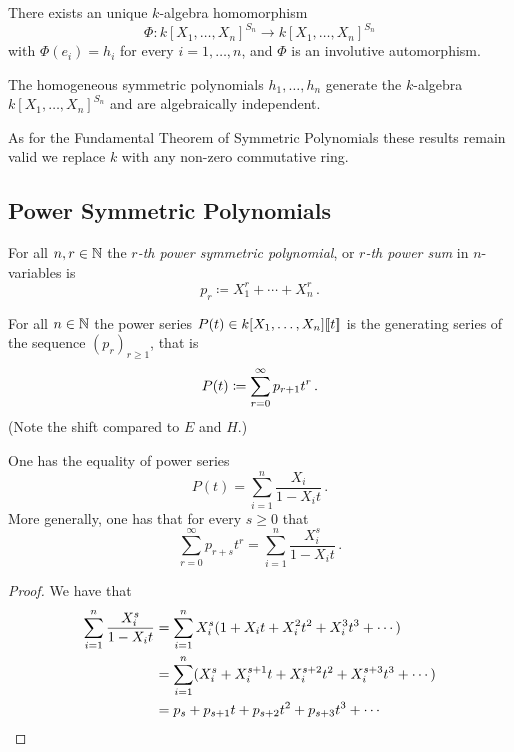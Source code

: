 \begin{corollary}
  There exists an unique $k$-algebra homomorphism
  \[
            \Phi
    \colon  k[X_1, \dotsc, X_n]^{S_n}
    \to     k[X_1, \dotsc, X_n]^{S_n}
  \]
  with $\Phi(e_i) = h_i$ for every $i = 1, \dotsc, n$, and $\Phi$ is an involutive automorphism.
\end{corollary}


\begin{corollary}
  The homogeneous symmetric polynomials $h_1, \dotsc, h_n$ generate the $k$-algebra $k[X_1, \dotsc, X_n]^{S_n}$ and are algebraically independent.
\end{corollary}


\begin{remark}
  As for the Fundamental Theorem of Symmetric Polynomials these results remain valid we replace $k$ with any non-zero commutative ring.
\end{remark}





\subsection{Power Symmetric Polynomials}


\begin{definition}
  For all $n, r \in \mathbb{N}$ the \emph{$r$-th power symmetric polynomial}, or \emph{$r$-th power sum} in $n$-variables is
  \[
              p_r
    \coloneqq X_1^r + \dotsb + X_n^r \,.
  \]
\end{definition}


\begin{definition}
  For all $n \in \mathbb{N}$ the power series $P(t) \in k[X_1, \dotsc, X_n]\!\left[\!\left[t\right]\!\right]$ is the generating series of the sequence $(p_r)_{r \geq 1}$, that is
  \[
            P(t)
  \coloneqq  \sum_{r=0}^\infty p_{r+1} t^r \,.
  \]
  (Note the shift compared to $E$ and $H$.)
\end{definition}


\begin{lemma}
  \label{lemma: explicit formula for P}
  One has the equality of power series
  \[
      P(t)
    = \sum_{i=1}^n \frac{X_i}{1 - X_i t} \,.
  \]
  More generally, one has that for every $s \geq 0$ that
  \[
      \sum_{r=0}^\infty p_{r+s} t^r
    = \sum_{i=1}^n \frac{X_i^s}{1 - X_i t} \,.
  \]
\end{lemma}


\begin{proof}
  We have that
  \begin{align*}
        \sum_{i=1}^n \frac{X_i^s}{1-X_i t}
    &=  \sum_{i=1}^n X_i^s (1 + X_i t + X_i^2 t^2 + X_i^3 t^3 + \dotsb) \\
    &=  \sum_{i=1}^n (X_i^s + X_i^{s+1} t + X_i^{s+2} t^2 + X_i^{s+3} t^3 + \dotsb) \\
    &=  p_s + p_{s+1} t + p_{s+2} t^2 + p_{s+3} t^3 + \dotsb
    \qedhere
  \end{align*}
\end{proof}


